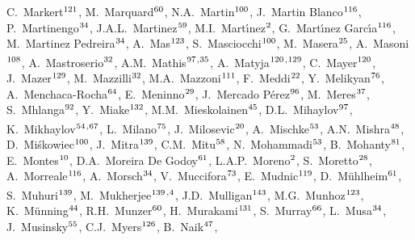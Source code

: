 \begin{flushleft}
C.~Markert$^\textrm{\scriptsize 121}$,
M.~Marquard$^\textrm{\scriptsize 60}$,
N.A.~Martin$^\textrm{\scriptsize 100}$,
J.~Martin Blanco$^\textrm{\scriptsize 116}$,
P.~Martinengo$^\textrm{\scriptsize 34}$,
J.A.L.~Martinez$^\textrm{\scriptsize 59}$,
M.I.~Mart\'{\i}nez$^\textrm{\scriptsize 2}$,
G.~Mart\'{\i}nez Garc\'{\i}a$^\textrm{\scriptsize 116}$,
M.~Martinez Pedreira$^\textrm{\scriptsize 34}$,
A.~Mas$^\textrm{\scriptsize 123}$,
S.~Masciocchi$^\textrm{\scriptsize 100}$,
M.~Masera$^\textrm{\scriptsize 25}$,
A.~Masoni$^\textrm{\scriptsize 108}$,
A.~Mastroserio$^\textrm{\scriptsize 32}$,
A.M.~Mathis$^\textrm{\scriptsize 97}$\textsuperscript{,}$^\textrm{\scriptsize 35}$,
A.~Matyja$^\textrm{\scriptsize 120}$\textsuperscript{,}$^\textrm{\scriptsize 129}$,
C.~Mayer$^\textrm{\scriptsize 120}$,
J.~Mazer$^\textrm{\scriptsize 129}$,
M.~Mazzilli$^\textrm{\scriptsize 32}$,
M.A.~Mazzoni$^\textrm{\scriptsize 111}$,
F.~Meddi$^\textrm{\scriptsize 22}$,
Y.~Melikyan$^\textrm{\scriptsize 76}$,
A.~Menchaca-Rocha$^\textrm{\scriptsize 64}$,
E.~Meninno$^\textrm{\scriptsize 29}$,
J.~Mercado P\'erez$^\textrm{\scriptsize 96}$,
M.~Meres$^\textrm{\scriptsize 37}$,
S.~Mhlanga$^\textrm{\scriptsize 92}$,
Y.~Miake$^\textrm{\scriptsize 132}$,
M.M.~Mieskolainen$^\textrm{\scriptsize 45}$,
D.L.~Mihaylov$^\textrm{\scriptsize 97}$,
K.~Mikhaylov$^\textrm{\scriptsize 54}$\textsuperscript{,}$^\textrm{\scriptsize 67}$,
L.~Milano$^\textrm{\scriptsize 75}$,
J.~Milosevic$^\textrm{\scriptsize 20}$,
A.~Mischke$^\textrm{\scriptsize 53}$,
A.N.~Mishra$^\textrm{\scriptsize 48}$,
D.~Mi\'{s}kowiec$^\textrm{\scriptsize 100}$,
J.~Mitra$^\textrm{\scriptsize 139}$,
C.M.~Mitu$^\textrm{\scriptsize 58}$,
N.~Mohammadi$^\textrm{\scriptsize 53}$,
B.~Mohanty$^\textrm{\scriptsize 81}$,
E.~Montes$^\textrm{\scriptsize 10}$,
D.A.~Moreira De Godoy$^\textrm{\scriptsize 61}$,
L.A.P.~Moreno$^\textrm{\scriptsize 2}$,
S.~Moretto$^\textrm{\scriptsize 28}$,
A.~Morreale$^\textrm{\scriptsize 116}$,
A.~Morsch$^\textrm{\scriptsize 34}$,
V.~Muccifora$^\textrm{\scriptsize 73}$,
E.~Mudnic$^\textrm{\scriptsize 119}$,
D.~M{\"u}hlheim$^\textrm{\scriptsize 61}$,
S.~Muhuri$^\textrm{\scriptsize 139}$,
M.~Mukherjee$^\textrm{\scriptsize 139}$\textsuperscript{,}$^\textrm{\scriptsize 4}$,
J.D.~Mulligan$^\textrm{\scriptsize 143}$,
M.G.~Munhoz$^\textrm{\scriptsize 123}$,
K.~M\"{u}nning$^\textrm{\scriptsize 44}$,
R.H.~Munzer$^\textrm{\scriptsize 60}$,
H.~Murakami$^\textrm{\scriptsize 131}$,
S.~Murray$^\textrm{\scriptsize 66}$,
L.~Musa$^\textrm{\scriptsize 34}$,
J.~Musinsky$^\textrm{\scriptsize 55}$,
C.J.~Myers$^\textrm{\scriptsize 126}$,
B.~Naik$^\textrm{\scriptsize 47}$,

\end{flushleft}
